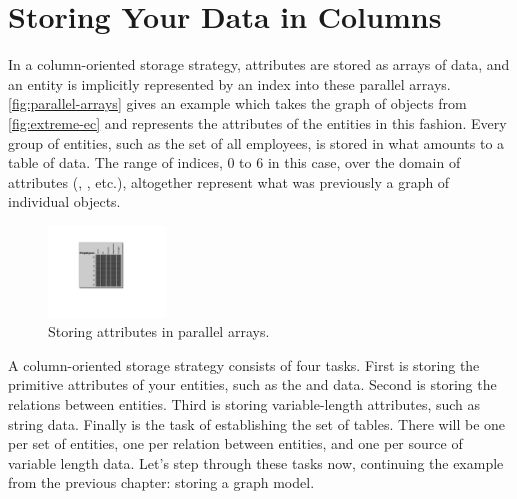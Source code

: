 
\section{Storing Your Data in Columns}
\label{sec:column-oriented}

In a column-oriented storage strategy, attributes are stored as arrays of data,
and an entity is implicitly represented by an index into these parallel
arrays. \autoref{fig:parallel-arrays} gives an example which takes the graph of
objects from \autoref{fig:extreme-ec} and represents the attributes of the
 entities in this fashion. Every group of entities, such as the
set of all employees, is stored in what amounts to a table of data. The range of
indices, 0 to 6 in this case, over the domain of attributes (,
, etc.), altogether represent what was previously a graph of
individual objects.


\begin{figure}
\centering
\vspace{-5mm}
   \includegraphics[width=0.28\textwidth]{part3/Figures/extreme/EC-example-for-columns2}
   \caption{Storing attributes in parallel arrays.}
   \label{fig:parallel-arrays}
\end{figure}
A column-oriented storage strategy consists of four tasks. First is storing the
primitive attributes of your entities, such as the  and
 data. Second is storing the relations between entities. Third is
storing variable-length attributes, such as string data. Finally is the task of
establishing the set of tables. There will be one per set of entities, one per relation between
entities, and one per source of variable length data. Let's step through these tasks now,
continuing the example from the previous chapter: storing a graph model.

